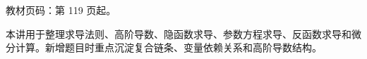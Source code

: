 
\begin{knowledgeBox}
教材页码：第 119 页起。

本讲用于整理求导法则、高阶导数、隐函数求导、参数方程求导、反函数求导和微分计算。新增题目时重点沉淀复合链条、变量依赖关系和高阶导数结构。
\end{knowledgeBox}
